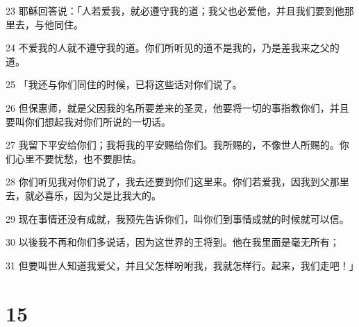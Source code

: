 \par 23 耶稣回答说：「人若爱我，就必遵守我的道；我父也必爱他，并且我们要到他那里去，与他同住。
\par 24 不爱我的人就不遵守我的道。你们所听见的道不是我的，乃是差我来之父的道。
\par 25 「我还与你们同住的时候，已将这些话对你们说了。
\par 26 但保惠师，就是父因我的名所要差来的圣灵，他要将一切的事指教你们，并且要叫你们想起我对你们所说的一切话。
\par 27 我留下平安给你们；我将我的平安赐给你们。我所赐的，不像世人所赐的。你们心里不要忧愁，也不要胆怯。
\par 28 你们听见我对你们说了，我去还要到你们这里来。你们若爱我，因我到父那里去，就必喜乐，因为父是比我大的。
\par 29 现在事情还没有成就，我预先告诉你们，叫你们到事情成就的时候就可以信。
\par 30 以後我不再和你们多说话，因为这世界的王将到。他在我里面是毫无所有；
\par 31 但要叫世人知道我爱父，并且父怎样吩咐我，我就怎样行。起来，我们走吧！」

\chapter{15}

